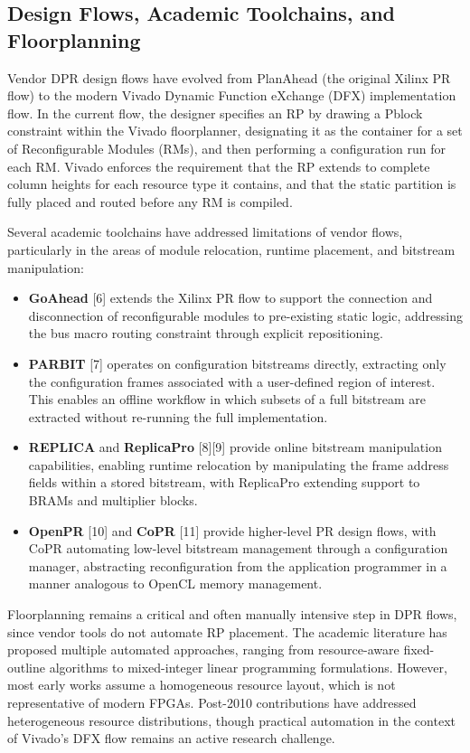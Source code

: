 \subsection{Design Flows, Academic Toolchains, and Floorplanning}

Vendor DPR design flows have evolved from PlanAhead (the original Xilinx PR flow) to the modern Vivado Dynamic Function eXchange (DFX) implementation flow. In the current flow, the designer specifies an RP by drawing a Pblock constraint within the Vivado floorplanner, designating it as the container for a set of Reconfigurable Modules (RMs), and then performing a configuration run for each RM. Vivado enforces the requirement that the RP extends to complete column heights for each resource type it contains, and that the static partition is fully placed and routed before any RM is compiled.

Several academic toolchains have addressed limitations of vendor flows, particularly in the areas of module relocation, runtime placement, and bitstream manipulation:

\begin{itemize}
  \item \textbf{GoAhead} [6] extends the Xilinx PR flow to support the connection and disconnection of reconfigurable modules to pre-existing static logic, addressing the bus macro routing constraint through explicit repositioning.
  \item \textbf{PARBIT} [7] operates on configuration bitstreams directly, extracting only the configuration frames associated with a user-defined region of interest. This enables an offline workflow in which subsets of a full bitstream are extracted without re-running the full implementation.
  \item \textbf{REPLICA} and \textbf{ReplicaPro} [8][9] provide online bitstream manipulation capabilities, enabling runtime relocation by manipulating the frame address fields within a stored bitstream, with ReplicaPro extending support to BRAMs and multiplier blocks.
  \item \textbf{OpenPR} [10] and \textbf{CoPR} [11] provide higher-level PR design flows, with CoPR automating low-level bitstream management through a configuration manager, abstracting reconfiguration from the application programmer in a manner analogous to OpenCL memory management.
\end{itemize}
Floorplanning remains a critical and often manually intensive step in DPR flows, since vendor tools do not automate RP placement. The academic literature has proposed multiple automated approaches, ranging from resource-aware fixed-outline algorithms to mixed-integer linear programming formulations. However, most early works assume a homogeneous resource layout, which is not representative of modern FPGAs. Post-2010 contributions have addressed heterogeneous resource distributions, though practical automation in the context of Vivado's DFX flow remains an active research challenge.

